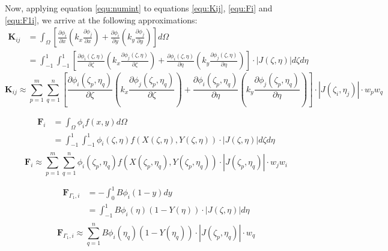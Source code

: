 \documentclass[letterpaper,10pt]{article}
\begin{document}
Now, applying equation \ref{equ:numint} to equations \ref{equ:Kij}, \ref{equ:Fi} and \ref{equ:F1i}, we arrive at the following approximations:
\[\begin{split}
	\mathbf{K}_{ij} &= \int_\Omega \left[ \frac{\partial \phi_i}{\partial x}\left(k_x\frac{\partial \phi_j}{\partial x}\right) + \frac{\partial \phi_i}{\partial y}\left(k_y\frac{\partial \phi_j}{\partial y}\right) \right]d\Omega \\
	&= \int_{-1}^1\int_{-1}^1 \left[ \frac{\partial \phi_i\left(\zeta,\eta\right)}{\partial \zeta}\left(k_x\frac{\partial \phi_j\left(\zeta,\eta\right)}{\partial \zeta}\right) + \frac{\partial \phi_i\left(\zeta,\eta\right)}{\partial \eta}\left(k_y\frac{\partial \phi_j\left(\zeta,\eta\right)}{\partial \eta}\right) \right]\cdot\left|J\left(\zeta,\eta\right)\right|d\zeta d\eta
\end{split}\]
\begin{equation}
\label{equ:Kij_quad}
	\boxed{\mathbf{K}_{ij} \approx \sum_{p=1}^m\sum_{q=1}^n \left[\frac{\partial \phi_i\left(\zeta_p,\eta_q\right)}{\partial \zeta}\left(k_x\frac{\partial \phi_j\left(\zeta_p,\eta_q\right)}{\partial \zeta}\right) + \frac{\partial \phi_i\left(\zeta_p,\eta_q\right)}{\partial \eta}\left(k_y\frac{\partial \phi_j\left(\zeta_p,\eta_q\right)}{\partial \eta}\right) \right]\cdot\left|J\left(\zeta_i,\eta_j\right)\right|\cdot w_pw_q}
\end{equation}

\[\begin{split}
	\mathbf{F}_i &= \int_\Omega \phi_if(x,y)d\Omega \\
	&= \int_{-1}^1\int_{-1}^1 \phi_i\left(\zeta,\eta\right)f\left(X(\zeta,\eta),Y(\zeta,\eta)\right)\cdot \left|J\left(\zeta,\eta\right)\right|d\zeta d\eta \\
\end{split}\]
\begin{equation}
\label{equ:Fi_quad}
	\boxed{\mathbf{F}_i \approx \sum_{p=1}^m\sum_{q=1}^n\phi_i\left(\zeta_p,\eta_q\right)f\left(X(\zeta_p,\eta_q),Y(\zeta_p,\eta_q)\right)\cdot \left|J\left(\zeta_p,\eta_q\right)\right| \cdot w_jw_i}
\end{equation}

\[\begin{split}
	\mathbf{F}_{\Gamma_1,i} &= -\int_0^1 B \phi_i \left(1-y\right)dy \\
	&= \int_{-1}^1 B\phi_i\left(\eta\right)\left(1-Y(\eta)\right)\cdot \left|J\left(\zeta,\eta\right)\right|d\eta \\
\end{split}\]
\begin{equation}
\label{equ:F1i_quad}
	\boxed{\mathbf{F}_{\Gamma_1,i} \approx \sum_{q=1}^n B\phi_i\left(\eta_q\right)\left(1-Y(\eta_q)\right)\cdot \left|J\left(\zeta_p,\eta_q\right)\right|\cdot w_q}
\end{equation}
\end{document}
